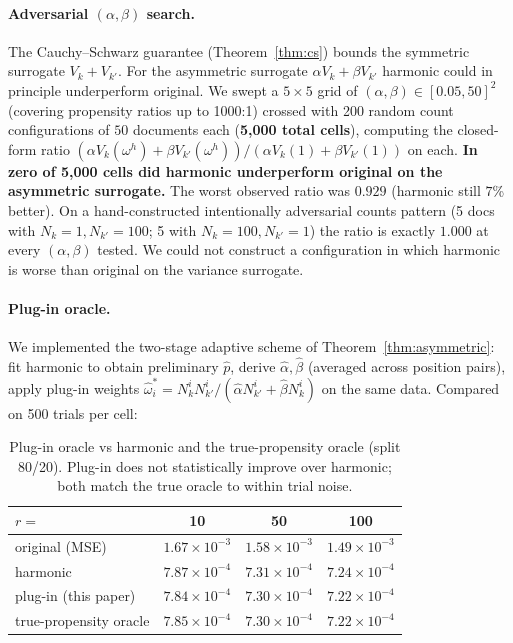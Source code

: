 \documentclass[sigconf]{acmart}
\begin{document}
\paragraph{Adversarial $(\alpha,\beta)$ search.}
The Cauchy--Schwarz guarantee (Theorem~\ref{thm:cs}) bounds the symmetric
surrogate $V_k+V_{k'}$. For the asymmetric surrogate
$\alpha V_k + \beta V_{k'}$ harmonic could in principle underperform
original. We swept a $5{\times}5$ grid of
$(\alpha,\beta) \in [0.05, 50]^2$ (covering propensity ratios up to 1000:1)
crossed with 200 random count configurations of $50$ documents each
(\textbf{5{,}000 total cells}), computing the closed-form ratio
$(\alpha V_k(\omega^h)+\beta V_{k'}(\omega^h))/(\alpha V_k(1)+\beta V_{k'}(1))$
on each. \textbf{In zero of 5{,}000 cells did harmonic underperform
original on the asymmetric surrogate.} The worst observed ratio was
$0.929$ (harmonic still $7$\% better). On a hand-constructed
intentionally adversarial counts pattern (5 docs with $N_k{=}1, N_{k'}{=}100$;
5 with $N_k{=}100, N_{k'}{=}1$) the ratio is exactly $1.000$ at every
$(\alpha,\beta)$ tested. We could not construct a configuration in which
harmonic is worse than original on the variance surrogate.

\paragraph{Plug-in oracle.}
We implemented the two-stage adaptive scheme of Theorem~\ref{thm:asymmetric}:
fit harmonic to obtain preliminary $\hat{p}$, derive
$\hat{\alpha}, \hat{\beta}$ (averaged across position pairs), apply plug-in
weights $\hat{\omega}_i^* = N_k^i N_{k'}^i/(\hat{\alpha} N_{k'}^i +
\hat{\beta} N_k^i)$ on the same data. Compared on 500 trials per cell:

\begin{table}[h]
\centering
\small
\caption{Plug-in oracle vs harmonic and the true-propensity oracle (split
80/20). Plug-in does not statistically improve over harmonic; both match
the true oracle to within trial noise.}
\label{tab:plugin}
\begin{tabular}{lccc}
\toprule
$r=$ & 10 & 50 & 100 \\
\midrule
original (MSE)            & $1.67{\times}10^{-3}$ & $1.58{\times}10^{-3}$ & $1.49{\times}10^{-3}$ \\
harmonic                  & $7.87{\times}10^{-4}$ & $7.31{\times}10^{-4}$ & $7.24{\times}10^{-4}$ \\
plug-in (this paper)      & $7.84{\times}10^{-4}$ & $7.30{\times}10^{-4}$ & $7.22{\times}10^{-4}$ \\
true-propensity oracle    & $7.85{\times}10^{-4}$ & $7.30{\times}10^{-4}$ & $7.22{\times}10^{-4}$ \\
\bottomrule
\end{tabular}
\end{table}
\end{document}
